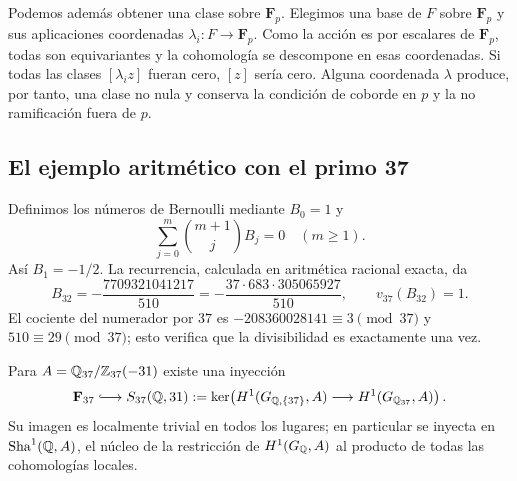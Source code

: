 Podemos además obtener una clase sobre $\mathbf F_p$.
Elegimos una base de $F$ sobre $\mathbf F_p$ y sus aplicaciones
coordenadas $\lambda_i:F\to\mathbf F_p$.
Como la acción es por escalares de $\mathbf F_p$, todas son
equivariantes y la cohomología se descompone en esas coordenadas.
Si todas las clases $[\lambda_i z]$ fueran cero, $[z]$ sería cero.
Alguna coordenada $\lambda$ produce, por tanto, una clase no nula
y conserva la condición de coborde en $p$ y la no ramificación
fuera de $p$.

\subsection{El ejemplo aritmético con el primo 37}

Definimos los números de Bernoulli mediante $B_0=1$ y
\begin{equation}
 \sum_{j=0}^{m}\binom{m+1}{j}B_j=0\quad(m\ge1).
 \label{eq:rs-bernoulli}
\end{equation}
Así $B_1=-1/2$. La recurrencia, calculada en aritmética racional
exacta, da
\begin{equation}
 B_{32}=-\frac{7709321041217}{510}
       =-\frac{37\cdot683\cdot305065927}{510},
 \qquad v_{37}(B_{32})=1.
 \label{eq:rs-B32}
\end{equation}
El cociente del numerador por $37$ es
$-208360028141\equiv3\pmod{37}$ y $510\equiv29\pmod{37}$;
esto verifica que la divisibilidad es exactamente una vez.

\begin{proposicion}
\label{prop:rs-37}
Para $A=\mathbb{Q}_{37}/\mathbb{Z}_{37}(-31)$ existe una inyección
\begin{equation}
 \mathbf F_{37}\lhook\joinrel\longrightarrow
 S_{37}(\Q,31):=
 \ker\!\left(H^1(G_{\Q,\{37\}},A)
                  \longrightarrow H^1(G_{\Q_{37}},A)\right).
 \label{eq:rs-37-selmer}
\end{equation}
Su imagen es localmente trivial en todos los lugares; en particular
se inyecta en $\operatorname{Sha}^1(\mathbb{Q},A)$, el núcleo de la restricción de
$H^1(G_{\mathbb{Q}},A)$ al producto de todas las cohomologías locales.
\end{proposicion}

